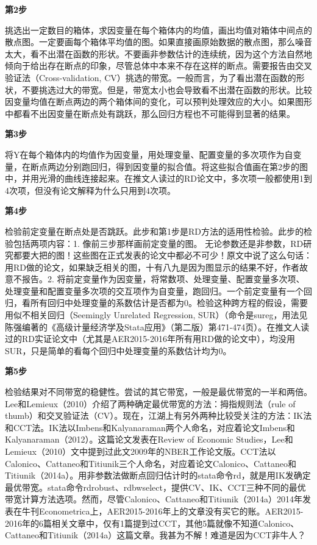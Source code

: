 \documentclass[cn,12pt,math=newtx,citestyle=gb7714-2015,bibstyle=gb7714-2015]{elegantbook}
\begin{document}
	\textbf{第2步}
	
	挑选出一定数目的箱体，求因变量在每个箱体内的均值，画出均值对箱体中间点的散点图。一定要画每个箱体平均值的图。如果直接画原始数据的散点图，那么噪音太大，看不出潜在函数的形状。不要画非参数估计的连续统，因为这个方法自然地倾向于给出存在断点的印象，尽管总体中本来不存在这样的断点。需要报告由交叉验证法（Cross-validation, CV）挑选的带宽。一般而言，为了看出潜在函数的形状，不要挑选过大的带宽。但是，带宽太小也会导致看不出潜在函数的形状。比较因变量均值在断点两边的两个箱体间的变化，可以预判处理效应的大小。如果图形中都看不出因变量在断点处有跳跃，那么回归方程也不可能得到显著的结果。
	
	\textbf{第3步}
	
	将Y在每个箱体内的均值作为因变量，用处理变量、配置变量的多次项作为自变量，在断点两边分别跑回归，得到因变量的拟合值。将这些拟合值画在第2步的图中，并用光滑的曲线连接起来。在推文人读过的RD论文中，多次项一般都使用1到4次项，但没有论文解释为什么只用到4次项。
	
	\textbf{第4步}
	
	检验前定变量在断点处是否跳跃。此步和第1步是RD方法的适用性检验。此步的检验包括两项内容：1. 像前三步那样画前定变量的图。 无论参数还是非参数，RD研究都要大把的图！这些图在正式发表的论文中都必不可少！原文中说了这么句话：用RD做的论文，如果缺乏相关的图，十有八九是因为图显示的结果不好，作者故意不报告。2. 将前定变量作为因变量，将常数项、处理变量、配置变量多次项、处理变量和配置变量多次项的交互项作为自变量，跑回归。一个前定变量有一个回归，看所有回归中处理变量的系数估计是否都为0。检验这种跨方程的假设，需要用似不相关回归（Seemingly Unrelated Regression, SUR）（命令是sureg，用法见陈强编著的《高级计量经济学及Stata应用》（第二版）第471-474页）。在推文人读过的RD实证论文中（尤其是AER2015-2016年所有用RD做的论文中），均没用SUR，只是简单的看每个回归中处理变量的系数估计均为0。
	
	\textbf{第5步}
	
	检验结果对不同带宽的稳健性。尝试的其它带宽，一般是最优带宽的一半和两倍。Lee和Lemieux（2010）介绍了两种确定最优带宽的方法：拇指规则法（rule of thumb）和交叉验证法（CV）。现在，江湖上有另外两种比较受关注的方法：IK法和CCT法。IK法以Imbens和Kalyanaraman两个人命名，对应着论文Imbens和Kalyanaraman（2012）。这篇论文发表在Review of Economic Studies，Lee和Lemieux（2010）文中提到过此文2009年的NBER工作论文版。CCT法以Calonico、Cattaneo和Titiunik三个人命名，对应着论文Calonico、Cattaneo和Titiunik（2014a）。用非参数法做断点回归估计时的stata命令rd，就是用IK发确定最优带宽。stata命令rdrobust、rdbwselect，提供CV、IK、CCT三种不同的最优带宽计算方法选项。然而，尽管Calonico、Cattaneo和Titiunik（2014a）2014年发表在牛刊Econometrica上，AER2015-2016年上的文章没有买它的账。AER2015-2016年的6篇相关文章中，仅有1篇提到过CCT，其他5篇就像不知道Calonico、Cattaneo和Titiunik（2014a）这篇文章。我甚为不解！难道是因为CCT非牛人？
	
\end{document}
